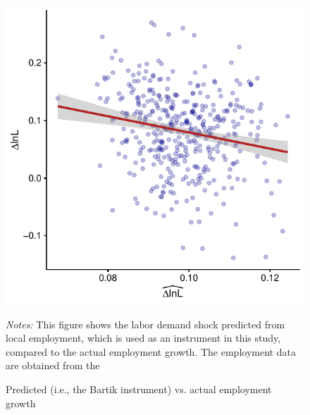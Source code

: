 \documentclass[
  12pt,
]{article}
\begin{document}
\begin{figure}[H]
\centering

\begin{center}\includegraphics{output/figs/predicted-vs-actual-labor-demand-shock-1} \end{center}

\caption{Predicted (i.e., the Bartik instrument) vs. actual employment growth}
\medskip
\begin{minipage}{0.9\textwidth}
\footnotesize
\textit{Notes:} This figure shows the labor demand shock predicted from local employment, which is used as an instrument in this study, compared to the actual employment growth. The employment data are obtained from the \citet{atlasde2022}
\end{minipage}
\end{figure}
\end{document}
